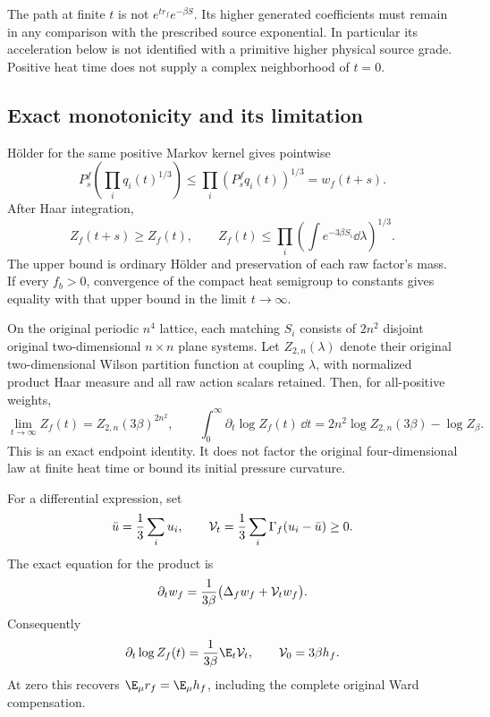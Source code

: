 The path at finite \(t\) is not \(e^{tr_f}e^{-\beta S}\). Its higher generated coefficients must remain in any comparison with the prescribed source exponential. In particular its acceleration below is not identified with a primitive higher physical source grade. Positive heat time does not supply a complex neighborhood of \(t=0\).

\subsection{Exact monotonicity and its limitation}

H\"older for the same positive Markov kernel gives pointwise
\[
 P_s^f\!\left(\prod_iq_i(t)^{1/3}\right)
 \le\prod_i(P_s^fq_i(t))^{1/3}
 =w_f(t+s).
\]
After Haar integration,
\begin{equation}
 Z_f(t+s)\ge Z_f(t),\qquad
 Z_f(t)\le\prod_i
       \left(\int e^{-3\beta S_i}\dd\lambda\right)^{1/3}.
 \label{rsm:heatmonotonicity}
\end{equation}
The upper bound is ordinary H\"older and preservation of each raw factor's mass. If every \(f_b>0\), convergence of the compact heat semigroup to constants gives equality with that upper bound in the limit \(t\to\infty\).

On the original periodic \(n^4\) lattice, each matching \(S_i\) consists of \(2n^2\) disjoint original two-dimensional \(n\times n\) plane systems. Let \(Z_{2,n}(\lambda)\) denote their original two-dimensional Wilson partition function at coupling \(\lambda\), with normalized product Haar measure and all raw action scalars retained. Then, for all-positive weights,
\begin{equation}
 \lim_{t\to\infty}Z_f(t)=Z_{2,n}(3\beta)^{2n^2},\qquad
 \int_0^\infty\partial_t\log Z_f(t)\,\dd t
 =2n^2\log Z_{2,n}(3\beta)-\log Z_\beta.
 \label{rsm:planarendpoint}
\end{equation}
This is an exact endpoint identity. It does not factor the original four-dimensional law at finite heat time or bound its initial pressure curvature.

For a differential expression, set
\[
 \bar u=\frac13\sum_i u_i,\qquad
 {\cal V}_t=\frac13\sum_i\Gamma_f(u_i-\bar u)\ge0.
\]
The exact equation for the product is
\[
 \partial_tw_f=\frac1{3\beta}
                 \bigl(\Delta_fw_f+{\cal V}_t w_f\bigr).
\]
Consequently
\begin{equation}
 \partial_t\log Z_f(t)=\frac1{3\beta}\E_t{\cal V}_t,
 \qquad {\cal V}_0=3\beta h_f.
 \label{rsm:heatentropy}
\end{equation}
At zero this recovers \(\E_\mu r_f=\E_\mu h_f\), including the complete original Ward compensation.


